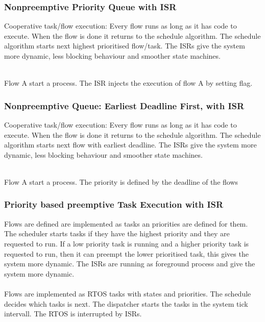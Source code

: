 \subsubsection{Nonpreemptive Priority Queue with ISR}
Cooperative task/flow execution: Every flow runs as long as it has code to execute.
When the flow is done it returns to the schedule algorithm.
The schedule algorithm starts next highest prioritised flow/task.
The ISRs give the system more dynamic, less blocking behaviour and smoother state machines.
\begin{paracol}{3}
  
  \switchcolumn
  
  \switchcolumn
  
\end{paracol}
\\
Flow A start a process.
The ISR injects the execution of flow A by setting flag.

\subsubsection{Nonpreemptive Queue: Earliest Deadline First, with ISR}
Cooperative task/flow execution: Every flow runs as long as it has code to execute.
When the flow is done it returns to the schedule algorithm.
The schedule algorithm starts next flow with earliest deadline.
The ISRs give the system more dynamic, less blocking behaviour and smoother state machines.
\begin{paracol}{3}
  
  \switchcolumn
  
  \switchcolumn
  
\end{paracol}
\\
Flow A start a process.
The priority is defined by the deadline of the flows

\subsubsection{Priority based preemptive Task Execution with ISR}
Flows are defined are implemented as tasks an priorities are defined for them.
The scheduler starts tasks if they have the highest priority and they are requested to run.
If a low priority task is running and a higher priority task is requested to run, then it can preempt the lower prioritised task, this gives the system more dynamic.
The ISRs are running as foreground process and give the system more dynamic.\\
\\
Flows are implemented as RTOS tasks with states and priorities.
The schedule decides which tasks is next.
The dispatcher starts the tasks in the system tick intervall.
The RTOS is interrupted by ISRs.

